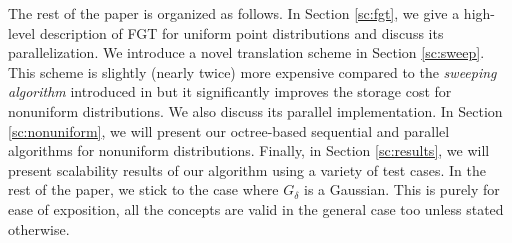 The rest of the paper is organized as follows. In Section \ref{sc:fgt}, we give a high-level description of FGT for uniform point distributions and discuss its parallelization. We introduce a novel translation scheme in Section \ref{sc:sweep}. This scheme is slightly (nearly twice) more expensive compared to the {\em sweeping algorithm} introduced in \cite{greengard98} but it significantly improves the storage cost for nonuniform distributions. We also discuss its parallel implementation. In Section \ref{sc:nonuniform}, we will present our octree-based sequential and parallel algorithms for nonuniform distributions. Finally, in Section \ref{sc:results}, we will present scalability results of our algorithm using a variety of test cases. 
In the rest of the paper, we stick to the case where $G_\delta$ is a Gaussian. This is purely for ease of exposition, all the concepts are valid in the general case too unless stated otherwise. 
